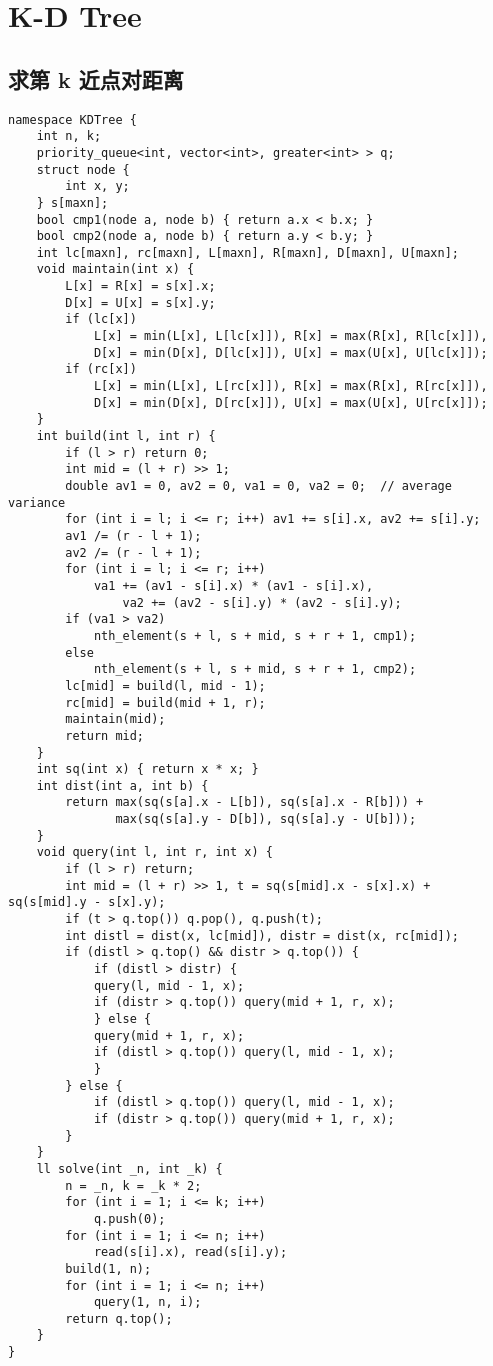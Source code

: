\section{K-D Tree}

\subsection{求第 k 近点对距离}

\begin{verbatim}
namespace KDTree {
    int n, k;
    priority_queue<int, vector<int>, greater<int> > q;
    struct node {
        int x, y;
    } s[maxn];
    bool cmp1(node a, node b) { return a.x < b.x; }
    bool cmp2(node a, node b) { return a.y < b.y; }
    int lc[maxn], rc[maxn], L[maxn], R[maxn], D[maxn], U[maxn];
    void maintain(int x) {
        L[x] = R[x] = s[x].x;
        D[x] = U[x] = s[x].y;
        if (lc[x])
            L[x] = min(L[x], L[lc[x]]), R[x] = max(R[x], R[lc[x]]),
            D[x] = min(D[x], D[lc[x]]), U[x] = max(U[x], U[lc[x]]);
        if (rc[x])
            L[x] = min(L[x], L[rc[x]]), R[x] = max(R[x], R[rc[x]]),
            D[x] = min(D[x], D[rc[x]]), U[x] = max(U[x], U[rc[x]]);
    }
    int build(int l, int r) {
        if (l > r) return 0;
        int mid = (l + r) >> 1;
        double av1 = 0, av2 = 0, va1 = 0, va2 = 0;  // average variance
        for (int i = l; i <= r; i++) av1 += s[i].x, av2 += s[i].y;
        av1 /= (r - l + 1);
        av2 /= (r - l + 1);
        for (int i = l; i <= r; i++)
            va1 += (av1 - s[i].x) * (av1 - s[i].x),
                va2 += (av2 - s[i].y) * (av2 - s[i].y);
        if (va1 > va2)
            nth_element(s + l, s + mid, s + r + 1, cmp1);
        else
            nth_element(s + l, s + mid, s + r + 1, cmp2);
        lc[mid] = build(l, mid - 1);
        rc[mid] = build(mid + 1, r);
        maintain(mid);
        return mid;
    }
    int sq(int x) { return x * x; }
    int dist(int a, int b) {
        return max(sq(s[a].x - L[b]), sq(s[a].x - R[b])) +
               max(sq(s[a].y - D[b]), sq(s[a].y - U[b]));
    }
    void query(int l, int r, int x) {
        if (l > r) return;
        int mid = (l + r) >> 1, t = sq(s[mid].x - s[x].x) + sq(s[mid].y - s[x].y);
        if (t > q.top()) q.pop(), q.push(t);
        int distl = dist(x, lc[mid]), distr = dist(x, rc[mid]);
        if (distl > q.top() && distr > q.top()) {
            if (distl > distr) {
            query(l, mid - 1, x);
            if (distr > q.top()) query(mid + 1, r, x);
            } else {
            query(mid + 1, r, x);
            if (distl > q.top()) query(l, mid - 1, x);
            }
        } else {
            if (distl > q.top()) query(l, mid - 1, x);
            if (distr > q.top()) query(mid + 1, r, x);
        }
    }
    ll solve(int _n, int _k) {
        n = _n, k = _k * 2;
        for (int i = 1; i <= k; i++)
            q.push(0);
        for (int i = 1; i <= n; i++)
            read(s[i].x), read(s[i].y);
        build(1, n);
        for (int i = 1; i <= n; i++)
            query(1, n, i);
        return q.top();
    }
}
\end{verbatim}

